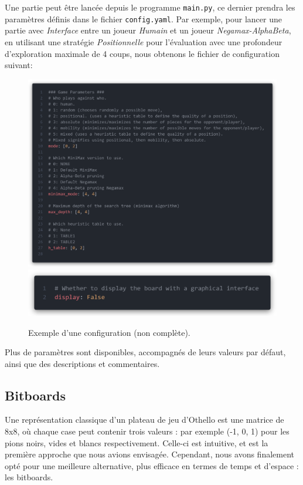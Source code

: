 Une partie peut être lancée depuis le programme \texttt{main.py}, ce dernier prendra les paramètres définis dans le fichier \texttt{config.yaml}. Par exemple, pour lancer une partie avec \textit{Interface} entre un joueur \textit{Humain} et un joueur \textit{Negamax-AlphaBeta}, en utilisant une stratégie \textit{Positionnelle} pour l'évaluation avec une profondeur d'exploration maximale de 4 coups, nous obtenons le fichier de configuration suivant: 
\begin{figure}[H]
    \centering
    \includegraphics[width=\textwidth]{ressources/configYaml.png}
    \includegraphics[width=\textwidth]{ressources/configYaml-display.png}
    \caption{Exemple d'une configuration (non complète).}
    \label{fig:configYaml}
\end{figure}

Plus de paramètres sont disponibles, accompagnés de leurs valeurs par défaut, ainsi que des descriptions et commentaires.


\subsection{Bitboards}
\label{subsec:bit}
Une représentation classique d'un plateau de jeu d'Othello est une matrice de 8x8, où chaque case peut contenir trois valeurs : par exemple (-1, 0, 1) pour les pions noirs, vides et blancs respectivement. Celle-ci est intuitive, et est la première approche que nous avions envisagée. Cependant, nous avons finalement opté pour une meilleure alternative, plus efficace en termes de temps et d'espace : les bitboards.

